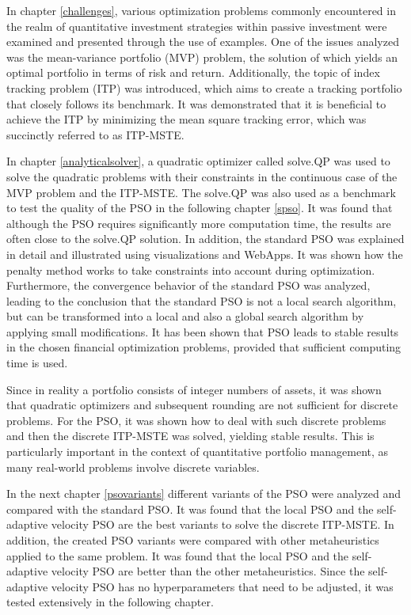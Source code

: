 \documentclass[
  oneside, a4paper, 12pt, openany]{book}
\theoremstyle{definition}
\theoremstyle{definition}
\theoremstyle{definition}
\theoremstyle{definition}
\theoremstyle{remark}
\begin{document}
In chapter \ref{challenges}, various optimization problems commonly encountered in the realm of quantitative investment strategies within passive investment were examined and presented through the use of examples. One of the issues analyzed was the mean-variance portfolio (MVP) problem, the solution of which yields an optimal portfolio in terms of risk and return. Additionally, the topic of index tracking problem (ITP) was introduced, which aims to create a tracking portfolio that closely follows its benchmark. It was demonstrated that it is beneficial to achieve the ITP by minimizing the mean square tracking error, which was succinctly referred to as ITP-MSTE.

In chapter \ref{analyticalsolver}, a quadratic optimizer called solve.QP was used to solve the quadratic problems with their constraints in the continuous case of the MVP problem and the ITP-MSTE. The solve.QP was also used as a benchmark to test the quality of the PSO in the following chapter \ref{spso}. It was found that although the PSO requires significantly more computation time, the results are often close to the solve.QP solution. In addition, the standard PSO was explained in detail and illustrated using visualizations and WebApps. It was shown how the penalty method works to take constraints into account during optimization. Furthermore, the convergence behavior of the standard PSO was analyzed, leading to the conclusion that the standard PSO is not a local search algorithm, but can be transformed into a local and also a global search algorithm by applying small modifications. It has been shown that PSO leads to stable results in the chosen financial optimization problems, provided that sufficient computing time is used.

Since in reality a portfolio consists of integer numbers of assets, it was shown that quadratic optimizers and subsequent rounding are not sufficient for discrete problems. For the PSO, it was shown how to deal with such discrete problems and then the discrete ITP-MSTE was solved, yielding stable results. This is particularly important in the context of quantitative portfolio management, as many real-world problems involve discrete variables.

In the next chapter \ref{psovariants} different variants of the PSO were analyzed and compared with the standard PSO. It was found that the local PSO and the self-adaptive velocity PSO are the best variants to solve the discrete ITP-MSTE. In addition, the created PSO variants were compared with other metaheuristics applied to the same problem. It was found that the local PSO and the self-adaptive velocity PSO are better than the other metaheuristics. Since the self-adaptive velocity PSO has no hyperparameters that need to be adjusted, it was tested extensively in the following chapter.
\end{document}
